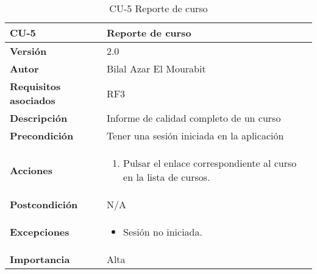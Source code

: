 \begin{table}[H]
	\centering
	\begin{tabularx}{\linewidth}{ p{} p{} }
		\toprule
		\textbf{CU-5}    & \textbf{Reporte de curso}\\
		\toprule
		\textbf{Versión}              & 2.0    \\
		\textbf{Autor}                & Bilal Azar El Mourabit \\
		\textbf{Requisitos asociados} & RF3 \\
		\textbf{Descripción}          & Informe de calidad completo de un curso \\
    		\textbf{Precondición}         & Tener una sesión iniciada en la aplicación  \\
		\textbf{Acciones}             & 
		\begin{enumerate}
			\def\labelenumi{\arabic{enumi}.}
			\tightlist
			\item Pulsar el enlace correspondiente al curso en la lista de cursos.
		\end{enumerate}\\
		\textbf{Postcondición}        & N/A \\
		\textbf{Excepciones}          & \begin{itemize}
		    \item Sesión no iniciada.
		\end{itemize} \\
		\textbf{Importancia}          & Alta \\
		\bottomrule
	\end{tabularx}
	\caption{CU-5 Reporte de curso}
\end{table}

